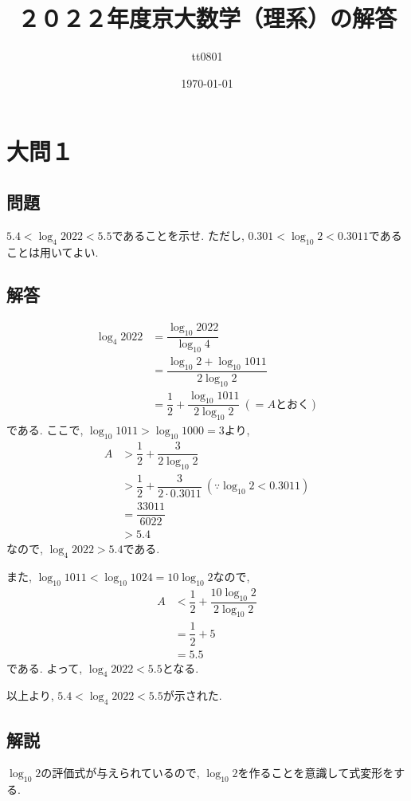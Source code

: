 \documentclass[dvipdfmx,a4paper]{jsarticle}
\title{２０２２年度京大数学（理系）の解答}
\author{tt0801}
\date{\today}
\newcommand{\2}{I\hspace{-1pt}I}
\newcommand{\3}{I\hspace{-1pt}I\hspace{-1pt}I}
\begin{document}
    \maketitle
    \section{大問１}
    \subsection{問題}
    $5.4 < \log_4 2022 < 5.5$であることを示せ. ただし, $0.301 < \log_{10} 2 < 0.3011$であることは用いてよい. 


    \subsection{解答}
    \begin{align*}
        \log_4 2022 &= \dfrac{\log_{10} 2022}{\log_{10} 4} \\
            &= \dfrac{\log_{10} 2 + \log_{10} 1011}{2\log_{10} 2} \\
            &= \dfrac{1}{2} + \dfrac{\log_{10} 1011}{2\log_{10} 2} \ (=A \mathrm{とおく})
    \end{align*}
    である. ここで, $\log_{10} 1011 > \log_{10} 1000 = 3$より, 
    \begin{align*}
        A & > \dfrac{1}{2} + \dfrac{3}{2\log_{10} 2} \\
        & > \dfrac{1}{2} + \dfrac{3}{2\cdot 0.3011} \ (\because \log_{10} 2 < 0.3011)\\
        &= \dfrac{33011}{6022} \\
        &> 5.4
    \end{align*}
    なので, $\log_4 2022 > 5.4$である. 
    
    また, $\log_{10} 1011 < \log_{10} 1024 = 10 \log_{10} 2$なので, 
    \begin{align*}
        A & < \dfrac{1}{2} + \dfrac{10 \log_{10} 2}{2\log_{10} 2} \\
        &= \dfrac{1}{2} + 5\\
        &= 5.5
    \end{align*}
    である. よって, $\log_4 2022 < 5.5$となる. 

    以上より, $5.4 < \log_4 2022 < 5.5$が示された. 


    \subsection{解説}
    $\log_{10} 2$の評価式が与えられているので, $\log_{10} 2$を作ることを意識して式変形をする. 
\end{document}
